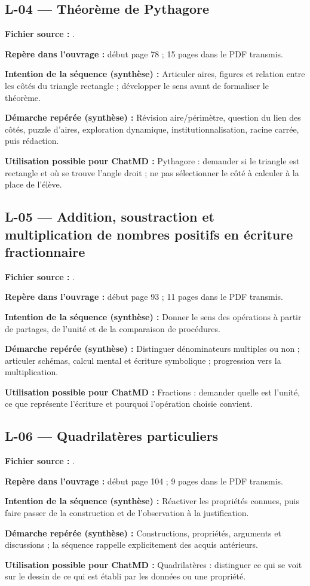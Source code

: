 \documentclass[11pt,a4paper]{article}
\begin{document}
\subsection{L-04 — Théorème de Pythagore}
\textbf{Fichier source :} .\par
\textbf{Repère dans l’ouvrage :} début page 78 ; 15 pages dans le PDF transmis.\par
\textbf{Intention de la séquence (synthèse) :} Articuler aires, figures et relation entre les côtés du triangle rectangle ; développer le sens avant de formaliser le théorème.\par
\textbf{Démarche repérée (synthèse) :} Révision aire/périmètre, question du lien des côtés, puzzle d’aires, exploration dynamique, institutionnalisation, racine carrée, puis rédaction.\par
\textbf{Utilisation possible pour ChatMD :} Pythagore : demander si le triangle est rectangle et où se trouve l’angle droit ; ne pas sélectionner le côté à calculer à la place de l’élève.\par
\subsection{L-05 — Addition, soustraction et multiplication de nombres positifs en écriture fractionnaire}
\textbf{Fichier source :} .\par
\textbf{Repère dans l’ouvrage :} début page 93 ; 11 pages dans le PDF transmis.\par
\textbf{Intention de la séquence (synthèse) :} Donner le sens des opérations à partir de partages, de l’unité et de la comparaison de procédures.\par
\textbf{Démarche repérée (synthèse) :} Distinguer dénominateurs multiples ou non ; articuler schémas, calcul mental et écriture symbolique ; progression vers la multiplication.\par
\textbf{Utilisation possible pour ChatMD :} Fractions : demander quelle est l’unité, ce que représente l’écriture et pourquoi l’opération choisie convient.\par
\subsection{L-06 — Quadrilatères particuliers}
\textbf{Fichier source :} .\par
\textbf{Repère dans l’ouvrage :} début page 104 ; 9 pages dans le PDF transmis.\par
\textbf{Intention de la séquence (synthèse) :} Réactiver les propriétés connues, puis faire passer de la construction et de l’observation à la justification.\par
\textbf{Démarche repérée (synthèse) :} Constructions, propriétés, arguments et discussions ; la séquence rappelle explicitement des acquis antérieurs.\par
\textbf{Utilisation possible pour ChatMD :} Quadrilatères : distinguer ce qui se voit sur le dessin de ce qui est établi par les données ou une propriété.\par
\end{document}
